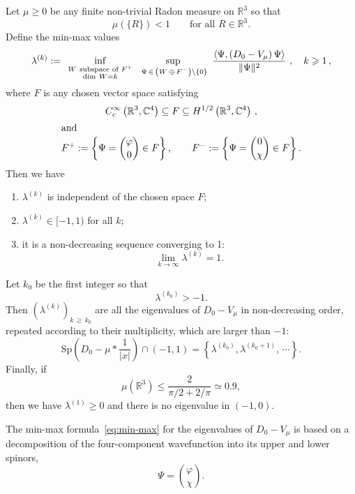\documentclass[AHL,Unicode,published]{cedram}
\newcommand{\R}{\mathbb{R}}
\newcommand{\C}{\mathbb{C}}
\newcommand{\Spec}{\mathrm{Sp}}
\newcommand\1{{\ensuremath {\mathds 1} }}
\renewcommand\phi{\varphi}
\newcommand{\ii}{\infty}
\newcommand\pscal[1]{{\ensuremath{\left\langle #1 \right\rangle}}}
\renewcommand{\geq}{\geqslant}
\renewcommand{\leq}{\leqslant}
\newcommand*{\romanenumi}{\renewcommand*{\theenumi}{\roman{enumi}}}
\begin{document}
\begin{theo}\label{thm:min-max}
Let $\mu\geq0$ be any finite non-trivial Radon measure on $\R^3$ so that
\[
\mu(\{R\})<1\qquad \text{for all }R\in\R^3.
\]
Define the min-max values
\begin{equation}\label{eq:min-max}
\lambda^{(k)} := \ \inf_{
\scriptstyle W \ \text{subspace of } F^+ \atop \scriptstyle {\rm dim}
\ W = k } \ \sup_{\,\scriptstyle\,\Psi\,\in\,\left(W\,\oplus\,F^-\right) \setminus \{ 0 \} } \
\frac{\pscal{\Psi, (D_0-V_\mu)\,\Psi}}{\|\Psi\|^2} \ ,
\quad k \geq 1\,,
\end{equation}
where $F$ is any chosen vector space satisfying
\begin{gather*}\label{telesc}
C^\ii_c\left(\R^3,\C^4\right)\subseteq F \subseteq H^{1/2}\left(\R^3,\C^4\right)\,,
\\
\intertext{and}
F^+:=\left\{\Psi=
\binom
{\phi}{0}\in F\right\},\qquad F^-:=\left\{\Psi=
\binom{0}{\chi}\in F\right\}.
\end{gather*}
Then we have
\begin{enumerate}\romanenumi
\item $\lambda^{(k)}$ is independent of the chosen space $F$;
\item $\lambda^{(k)}\in[-1,1)$ for all $k$;
\item it is a non-decreasing sequence converging to 1:
\begin{equation}\label{eq:limit_lambda_k}
\lim_{k\to\ii}\lambda^{(k)}=1.
\end{equation}
\end{enumerate}
Let $k_0$ be the first integer so that
\[
\lambda^{(k_0)}>-1.
\]
Then $(\lambda^{(k)})_{k\,\geq\,k_0}$ are all the eigenvalues of $D_0-V_\mu$ in non-decreasing order, repeated according to their multiplicity, which are larger than $-1$:
\[
\Spec\left(D_0-\mu\ast\frac1{|x|}\right)\cap (-1,1)=
\left\{\lambda^{(k_0)}, \lambda^{(k_0+1)},\,\cdots\right\}.
\]
Finally, if
\begin{equation}\label{eq:condition_Tix}
\mu(\R^3)\leq \frac{2}{\pi/2+2/\pi}\simeq 0.9,
\end{equation}
then we have $\lambda^{(1)}\geq0$ and there is no eigenvalue in $(-1,0)$.
\end{theo}

The min-max formula~\eqref{eq:min-max} for the eigenvalues of $D_0-V_\mu$ is based on a decomposition of the four-component wavefunction into its upper and lower spinors,
\[
\Psi=\binom{\phi}{\chi}.
\]
\end{document}
